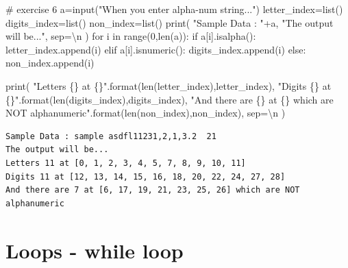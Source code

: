 \documentclass[
  letterpaper,
  DIV=11,
  numbers=noendperiod]{scrreprt}
\newenvironment{Shaded}{\begin{snugshade}}{\end{snugshade}}
\newcommand{\BuiltInTok}[1]{\textcolor[rgb]{0.00,0.23,0.31}{#1}}
\newcommand{\CharTok}[1]{\textcolor[rgb]{0.13,0.47,0.30}{#1}}
\newcommand{\CommentTok}[1]{\textcolor[rgb]{0.37,0.37,0.37}{#1}}
\newcommand{\ControlFlowTok}[1]{\textcolor[rgb]{0.00,0.23,0.31}{#1}}
\newcommand{\DecValTok}[1]{\textcolor[rgb]{0.68,0.00,0.00}{#1}}
\newcommand{\KeywordTok}[1]{\textcolor[rgb]{0.00,0.23,0.31}{#1}}
\newcommand{\NormalTok}[1]{\textcolor[rgb]{0.00,0.23,0.31}{#1}}
\newcommand{\OperatorTok}[1]{\textcolor[rgb]{0.37,0.37,0.37}{#1}}
\newcommand{\SpecialCharTok}[1]{\textcolor[rgb]{0.37,0.37,0.37}{#1}}
\newcommand{\StringTok}[1]{\textcolor[rgb]{0.13,0.47,0.30}{#1}}
\begin{document}
\begin{Shaded}
\begin{Highlighting}[]
\CommentTok{\# exercise 6}
\NormalTok{a}\OperatorTok{=}\BuiltInTok{input}\NormalTok{(}\StringTok{"When you enter alpha{-}num string..."}\NormalTok{)}
\NormalTok{letter\_index}\OperatorTok{=}\BuiltInTok{list}\NormalTok{()}
\NormalTok{digits\_index}\OperatorTok{=}\BuiltInTok{list}\NormalTok{()}
\NormalTok{non\_index}\OperatorTok{=}\BuiltInTok{list}\NormalTok{()}
\BuiltInTok{print}\NormalTok{(}
    \StringTok{"Sample Data : "}\OperatorTok{+}\NormalTok{a,}
    \StringTok{"The output will be..."}\NormalTok{,}
\NormalTok{    sep}\OperatorTok{=}\StringTok{\textquotesingle{}}\CharTok{\textbackslash{}n}\StringTok{\textquotesingle{}}
\NormalTok{)}
\ControlFlowTok{for}\NormalTok{ i }\KeywordTok{in} \BuiltInTok{range}\NormalTok{(}\DecValTok{0}\NormalTok{,}\BuiltInTok{len}\NormalTok{(a)):}
    \ControlFlowTok{if}\NormalTok{ a[i].isalpha():}
\NormalTok{        letter\_index.append(i)}
    \ControlFlowTok{elif}\NormalTok{ a[i].isnumeric():}
\NormalTok{        digits\_index.append(i)}
    \ControlFlowTok{else}\NormalTok{: non\_index.append(i)}

\BuiltInTok{print}\NormalTok{(}
    \StringTok{"Letters }\SpecialCharTok{\{\}}\StringTok{ at }\SpecialCharTok{\{\}}\StringTok{"}\NormalTok{.}\BuiltInTok{format}\NormalTok{(}\BuiltInTok{len}\NormalTok{(letter\_index),letter\_index),}
    \StringTok{"Digits }\SpecialCharTok{\{\}}\StringTok{ at }\SpecialCharTok{\{\}}\StringTok{"}\NormalTok{.}\BuiltInTok{format}\NormalTok{(}\BuiltInTok{len}\NormalTok{(digits\_index),digits\_index),}
    \StringTok{"And there are }\SpecialCharTok{\{\}}\StringTok{ at }\SpecialCharTok{\{\}}\StringTok{ which are NOT alphanumeric"}\NormalTok{.}\BuiltInTok{format}\NormalTok{(}\BuiltInTok{len}\NormalTok{(non\_index),non\_index),}
\NormalTok{    sep}\OperatorTok{=}\StringTok{\textquotesingle{}}\CharTok{\textbackslash{}n}\StringTok{\textquotesingle{}}
\NormalTok{)}
\end{Highlighting}
\end{Shaded}

\begin{verbatim}
Sample Data : sample asdfl11231,2,1,3.2  21
The output will be...
Letters 11 at [0, 1, 2, 3, 4, 5, 7, 8, 9, 10, 11]
Digits 11 at [12, 13, 14, 15, 16, 18, 20, 22, 24, 27, 28]
And there are 7 at [6, 17, 19, 21, 23, 25, 26] which are NOT alphanumeric
\end{verbatim}

\section{Loops - while loop}\label{loops---while-loop}
\end{document}
